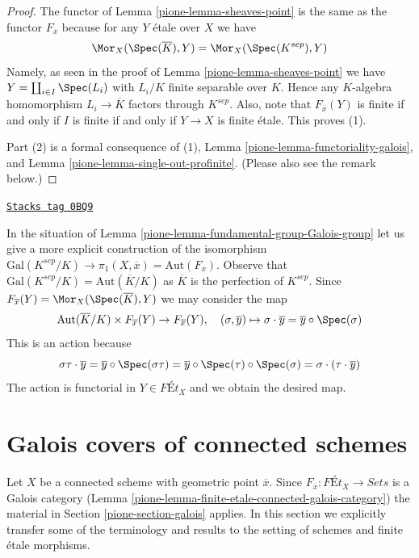 \begin{proof}

The functor of Lemma \ref{pione-lemma-sheaves-point} is the same as the functor
$F_{\overline{x}}$ because for any $Y$ \'etale over $X$ we have
$$
\Mor_X(\Spec(\overline{K}), Y) = \Mor_X(\Spec(K^{sep}), Y)
$$
Namely, as seen in the proof of Lemma \ref{pione-lemma-sheaves-point} we have
$Y = \coprod_{i \in I} \Spec(L_i)$ with $L_i/K$ finite separable over $K$.
Hence any $K$-algebra homomorphism $L_i \to \overline{K}$ factors
through $K^{sep}$. Also, note that $F_{\overline{x}}(Y)$ is finite
if and only if $I$ is finite if and only if $Y \to X$ is finite \'etale.
This proves (1).

\medskip\noindent
Part (2) is a formal consequence of (1),
Lemma \ref{pione-lemma-functoriality-galois}, and
Lemma \ref{pione-lemma-single-out-profinite}.
(Please also see the remark below.)
\end{proof}

\begin{remark}[Variance]
\label{pione-remark-variance}
\href{https://stacks.math.columbia.edu/tag/0BQ9}{\texttt{Stacks tag 0BQ9}}

In the situation of Lemma \ref{pione-lemma-fundamental-group-Galois-group}
let us give a more explicit construction of the isomorphism
$\text{Gal}(K^{sep}/K) \to
\pi_1(X, \overline{x}) = \text{Aut}(F_{\overline{x}})$.
Observe that
$\text{Gal}(K^{sep}/K) = \text{Aut}(\overline{K}/K)$
as $\overline{K}$ is the perfection of $K^{sep}$.
Since $F_{\overline{x}}(Y) = \Mor_X(\Spec(\overline{K}), Y)$
we may consider the map
$$
\text{Aut}(\overline{K}/K) \times F_{\overline{x}}(Y) \to F_{\overline{x}}(Y),
\quad
(\sigma, \overline{y}) \mapsto
\sigma \cdot \overline{y} = \overline{y} \circ \Spec(\sigma)
$$
This is an action because
$$
\sigma\tau \cdot \overline{y} =
\overline{y} \circ \Spec(\sigma\tau) =
\overline{y} \circ \Spec(\tau) \circ \Spec(\sigma) =
\sigma \cdot (\tau \cdot \overline{y})
$$
The action is functorial in $Y \in \textit{F\'Et}_X$ and we
obtain the desired map.
\end{remark}

\section{Galois covers of connected schemes}
\label{pione-section-finite-etale-under-galois}
Let $X$ be a connected scheme with geometric point $\overline{x}$.
Since $F_{\overline{x}} : \textit{F\'Et}_X \to \textit{Sets}$ is a
Galois category (Lemma \ref{pione-lemma-finite-etale-connected-galois-category})
the material in Section \ref{pione-section-galois} applies.
In this section we explicitly transfer some of the terminology
and results to the setting of schemes and finite \'etale morphisms.


